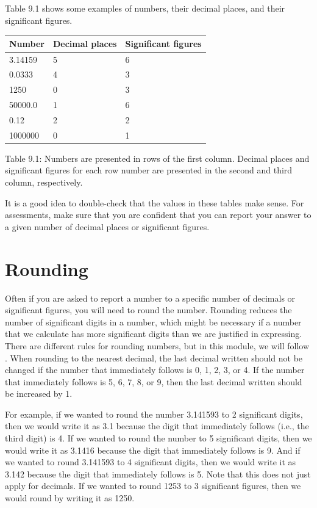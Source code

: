 \documentclass[
]{scrbook}
\begin{document}
Table 9.1 shows some examples of numbers, their decimal places, and their significant figures.

\begin{longtable}[]{@{}lll@{}}
\toprule
Number & Decimal places & Significant figures \\
\midrule
\endhead
3.14159 & 5 & 6 \\
0.0333 & 4 & 3 \\
1250 & 0 & 3 \\
50000.0 & 1 & 6 \\
0.12 & 2 & 2 \\
1000000 & 0 & 1 \\
\bottomrule
\end{longtable}

Table 9.1: Numbers are presented in rows of the first column. Decimal places and significant figures for each row number are presented in the second and third column, respectively.

It is a good idea to double-check that the values in these tables make sense.
For assessments, make sure that you are confident that you can report your answer to a given number of decimal places or significant figures.

\hypertarget{rounding}{%
\section{Rounding}\label{rounding}}

Often if you are asked to report a number to a specific number of decimals or significant figures, you will need to round the number.
Rounding reduces the number of significant digits in a number, which might be necessary if a number that we calculate has more significant digits than we are justified in expressing.
There are different rules for rounding numbers, but in this module, we will follow \citet{Sokal1995}.
When rounding to the nearest decimal, the last decimal written should not be changed if the number that immediately follows is 0, 1, 2, 3, or 4.
If the number that immediately follows is 5, 6, 7, 8, or 9, then the last decimal written should be increased by 1.

For example, if we wanted to round the number 3.141593 to 2 significant digits, then we would write it as 3.1 because the digit that immediately follows (i.e., the third digit) is 4.
If we wanted to round the number to 5 significant digits, then we would write it as 3.1416 because the digit that immediately follows is 9.
And if we wanted to round 3.141593 to 4 significant digits, then we would write it as 3.142 because the digit that immediately follows is 5.
Note that this does not just apply for decimals.
If we wanted to round 1253 to 3 significant figures, then we would round by writing it as 1250.
\end{document}
